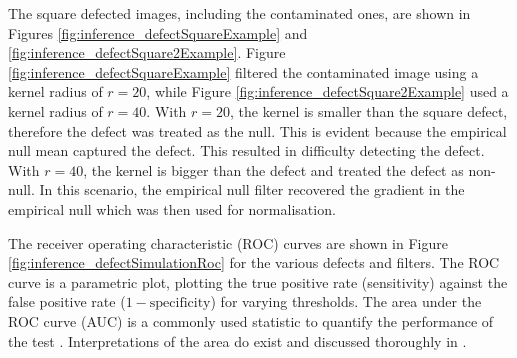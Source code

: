 The square defected images, including the contaminated ones, are shown in Figures \ref{fig:inference_defectSquareExample} and \ref{fig:inference_defectSquare2Example}. Figure \ref{fig:inference_defectSquareExample} filtered the contaminated image using a kernel radius of $r=20$, while Figure \ref{fig:inference_defectSquare2Example} used a kernel radius of $r=40$. With $r=20$, the kernel is smaller than the square defect, therefore the defect was treated as the null. This is evident because the empirical null mean captured the defect. This resulted in difficulty detecting the defect. With $r=40$, the kernel is bigger than the defect and treated the defect as non-null. In this scenario, the empirical null filter recovered the gradient in the empirical null which was then used for normalisation.

The receiver operating characteristic (ROC) curves \citep{green1966signal, metz1978basic, hanley1982meaning, friedman2001elements, cook2007use} are shown in Figure \ref{fig:inference_defectSimulationRoc} for the various defects and filters. The ROC curve is a parametric plot, plotting the true positive rate (sensitivity) against the false positive rate ($1-\text{specificity}$) for varying thresholds. The area under the ROC curve (AUC) is a commonly used statistic to quantify the performance of the test \citep{friedman2001elements}. Interpretations of the area do exist \citep{metz1978basic,hanley1982meaning} and discussed thoroughly in \cite{cook2007use}.

